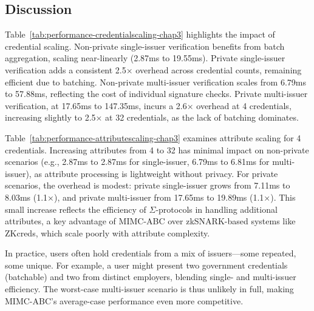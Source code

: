 \subsection{Discussion}

Table~\ref{tab:performance-credentialscaling-chap3} highlights the impact of credential scaling. Non-private single-issuer verification benefits from batch aggregation, scaling near-linearly (2.87ms to 19.55ms). Private single-issuer verification adds a consistent 2.5× overhead across credential counts, remaining efficient due to batching. Non-private multi-issuer verification scales from 6.79ms to 57.88ms, reflecting the cost of individual signature checks. Private multi-issuer verification, at 17.65ms to 147.35ms, incurs a 2.6× overhead at 4 credentials, increasing slightly to 2.5× at 32 credentials, as the lack of batching dominates.

Table~\ref{tab:performance-attributescaling-chap3} examines attribute scaling for 4 credentials. Increasing attributes from 4 to 32 has minimal impact on non-private scenarios (e.g., 2.87ms to 2.87ms for single-issuer, 6.79ms to 6.81ms for multi-issuer), as attribute processing is lightweight without privacy. For private scenarios, the overhead is modest: private single-issuer grows from 7.11ms to 8.03ms (1.1×), and private multi-issuer from 17.65ms to 19.89ms (1.1×). This small increase reflects the efficiency of $\Sigma$-protocols in handling additional attributes, a key advantage of MIMC-ABC over zkSNARK-based systems like ZKcreds, which scale poorly with attribute complexity.

In practice, users often hold credentials from a mix of issuers—some repeated, some unique. For example, a user might present two government credentials (batchable) and two from distinct employers, blending single- and multi-issuer efficiency. The worst-case multi-issuer scenario is thus unlikely in full, making MIMC-ABC’s average-case performance even more competitive. 
